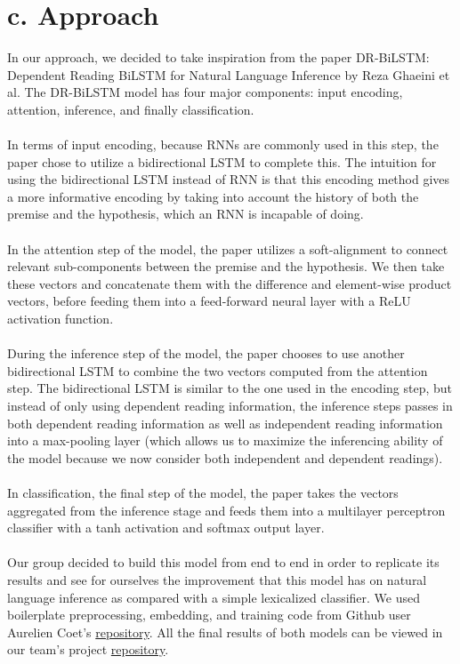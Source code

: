 \documentclass[12pt,letterpaper]{article}
\begin{document}
\section*{c. Approach}
In our approach, we decided to take inspiration from the paper DR-BiLSTM: Dependent Reading BiLSTM for Natural Language Inference by Reza Ghaeini et al.  The DR-BiLSTM model has four major components: input encoding, attention, inference, and finally classification.  \\ \\ 
In terms of input encoding, because RNNs are commonly used in this step, the paper chose to utilize a bidirectional LSTM to complete this. The intuition for using the bidirectional LSTM instead of RNN is that this encoding method gives a more informative encoding by taking into account the history of both the premise and the hypothesis, which an RNN is incapable of doing. \\ \\ 
In the attention step of the model, the paper utilizes a soft-alignment to connect relevant sub-components between the premise and the hypothesis. We then take these vectors and concatenate them with the difference and element-wise product vectors, before feeding them into a feed-forward neural layer with a ReLU activation function. \\ \\
During the inference step of the model, the paper chooses to use another bidirectional LSTM to combine the two vectors computed from the attention step. The bidirectional LSTM is similar to the one used in the encoding step, but instead of only using dependent reading information, the inference steps passes in both dependent reading information as well as independent reading information into a max-pooling layer (which allows us to maximize the inferencing ability of the model because we now consider both independent and dependent readings). \\ \\
In classification, the final step of the model, the paper takes the vectors aggregated from the inference stage and feeds them into a multilayer perceptron classifier with a tanh activation and softmax output layer. \\ \\
Our group decided to build this model from end to end in order to replicate its results and see for ourselves the improvement that this model has on natural language inference as compared with a simple lexicalized classifier. We used boilerplate preprocessing, embedding, and training code from Github user Aurelien Coet's   \href{https://github.com/coetaur0/LEAN}{repository}. All the final results of both models can be viewed in our team's project \href{https://github.com/kathleen-xue/csci544project}{repository}.
\end{document}
